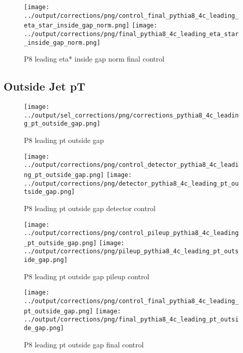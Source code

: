 \documentclass[11pt]{book}
\begin{document}
\begin{figure}[ht]
\centering
\texttt{[image: ../output/corrections/png/control\_final\_pythia8\_4c\_leading\_eta\_star\_inside\_gap\_norm.png]}
\texttt{[image: ../output/corrections/png/final\_pythia8\_4c\_leading\_eta\_star\_inside\_gap\_norm.png]}
\caption{P8 leading eta* inside gap norm final control}
\label{fig:p8_leading_eta_star_inside_gap_norm_final_control}
\end{figure}

\clearpage
\subsection{Outside Jet pT}

\begin{figure}[ht]
\centering
\texttt{[image: ../output/sel\_corrections/png/corrections\_pythia8\_4c\_leading\_pt\_outside\_gap.png]}
\caption{P8 leading pt outside gap}
\label{fig:p8_leading_pt_outside_gap}
\end{figure}


\begin{figure}[ht]
\centering
\texttt{[image: ../output/corrections/png/control\_detector\_pythia8\_4c\_leading\_pt\_outside\_gap.png]}
\texttt{[image: ../output/corrections/png/detector\_pythia8\_4c\_leading\_pt\_outside\_gap.png]}
\caption{P8 leading pt outside gap detector control}
\label{fig:p8_leading_pt_outside_gap_detector_control}
\end{figure}

\begin{figure}[ht]
\centering
\texttt{[image: ../output/corrections/png/control\_pileup\_pythia8\_4c\_leading\_pt\_outside\_gap.png]}
\texttt{[image: ../output/corrections/png/pileup\_pythia8\_4c\_leading\_pt\_outside\_gap.png]}
\caption{P8 leading pt outside gap pileup control}
\label{fig:p8_leading_pt_outside_gap_pileup_control}
\end{figure}


\begin{figure}[ht]
\centering
\texttt{[image: ../output/corrections/png/control\_final\_pythia8\_4c\_leading\_pt\_outside\_gap.png]}
\texttt{[image: ../output/corrections/png/final\_pythia8\_4c\_leading\_pt\_outside\_gap.png]}
\caption{P8 leading pt outside gap final control}
\label{fig:p8_leading_pt_outside_gap_final_control}
\end{figure}
\end{document}
